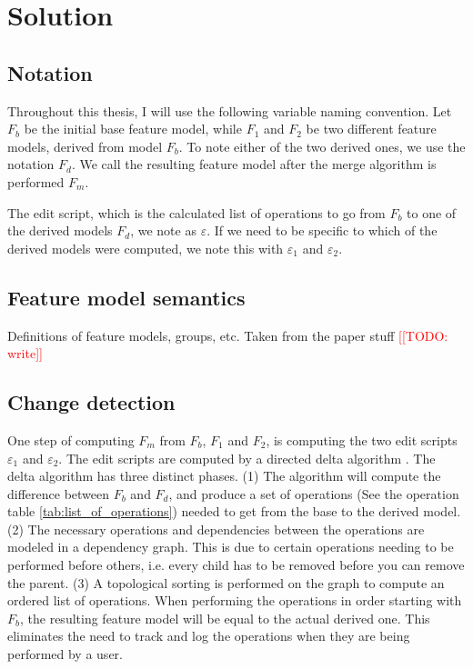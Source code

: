 \documentclass[a4paper,english]{ifimaster}
\newcommand{\todo}[1]{\textcolor{red}{[[TODO: #1]]}\PackageWarning{TODO:}{#1!}}
\newcommand{\Fb}{$F_b$}
\newcommand{\FOne}{$F_1$}
\newcommand{\FTwo}{$F_2$}
\newcommand{\Fd}{$F_d$}
\newcommand{\Fm}{$F_m$}
\newcommand{\Es}{$\varepsilon$}
\newcommand{\EsOne}{$\varepsilon_1$}
\newcommand{\EsTwo}{$\varepsilon_2$}
\begin{document}

\chapter{Solution}%
\label{cha:solution}

\section{Notation}%
\label{sec:notation}

Throughout this thesis, I will use the following variable naming convention. Let \Fb{} be the initial base feature model, while \FOne{} and \FTwo{} be two different feature models, derived from model \Fb{}. To note either of the two derived ones, we use the notation $F_d$. We call the resulting feature model after the merge algorithm is performed \Fm{}.

The edit script, which is the calculated list of operations to go from \Fb{} to one of the derived models \Fd{}, we note as \Es{}. If we need to be specific to which of the derived models were computed, we note this with \EsOne{} and \EsTwo{}.

\section{Feature model semantics}%
\label{sec:feature_model_semantics}

Definitions of feature models, groups, etc. Taken from the paper stuff \todo{write}

\section{Change detection}%
\label{sec:change_detection}

One step of computing \Fm{} from \Fb{}, \FOne{} and \FTwo{}, is computing the two edit scripts \EsOne{} and \EsTwo{}. The edit scripts are computed by a directed delta algorithm \cite{cite:tom_mens_software_merging_survey}. The delta algorithm has three distinct phases. (1) The algorithm will compute the difference between \Fb{} and \Fd{}, and produce a set of operations (See the operation table \ref{tab:list_of_operations}) needed to get from the base to the derived model. (2) The necessary operations and dependencies between the operations are modeled in a dependency graph. This is due to certain operations needing to be performed before others, i.e. every child has to be removed before you can remove the parent. (3) A topological sorting is performed on the graph to compute an ordered list of operations. When performing the operations in order starting with \Fb{}, the resulting feature model will be equal to the actual derived one. This eliminates the need to track and log the operations when they are being performed by a user.
\end{document}
